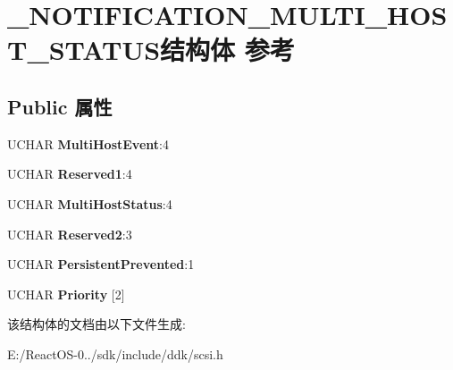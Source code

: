 \hypertarget{struct___n_o_t_i_f_i_c_a_t_i_o_n___m_u_l_t_i___h_o_s_t___s_t_a_t_u_s}{}\section{\+\_\+\+N\+O\+T\+I\+F\+I\+C\+A\+T\+I\+O\+N\+\_\+\+M\+U\+L\+T\+I\+\_\+\+H\+O\+S\+T\+\_\+\+S\+T\+A\+T\+U\+S结构体 参考}
\label{struct___n_o_t_i_f_i_c_a_t_i_o_n___m_u_l_t_i___h_o_s_t___s_t_a_t_u_s}
\subsection*{Public 属性}
\begin{DoxyCompactItemize}
\item 
\mbox{\label{struct___n_o_t_i_f_i_c_a_t_i_o_n___m_u_l_t_i___h_o_s_t___s_t_a_t_u_s_a2ab6e1273dca87231a5e6e82438574a3}} 
U\+C\+H\+AR {\bfseries Multi\+Host\+Event}\+:4
\item 
\mbox{\label{struct___n_o_t_i_f_i_c_a_t_i_o_n___m_u_l_t_i___h_o_s_t___s_t_a_t_u_s_a28c3740de6645ba499bded8568cf7526}} 
U\+C\+H\+AR {\bfseries Reserved1}\+:4
\item 
\mbox{\label{struct___n_o_t_i_f_i_c_a_t_i_o_n___m_u_l_t_i___h_o_s_t___s_t_a_t_u_s_a83ca88e2b365af63015f7e22d12b6eec}} 
U\+C\+H\+AR {\bfseries Multi\+Host\+Status}\+:4
\item 
\mbox{\label{struct___n_o_t_i_f_i_c_a_t_i_o_n___m_u_l_t_i___h_o_s_t___s_t_a_t_u_s_a4f3229c641f009014557c128196d10f2}} 
U\+C\+H\+AR {\bfseries Reserved2}\+:3
\item 
\mbox{\label{struct___n_o_t_i_f_i_c_a_t_i_o_n___m_u_l_t_i___h_o_s_t___s_t_a_t_u_s_a43bb29c4e3f4553335df92c5ac453bfc}} 
U\+C\+H\+AR {\bfseries Persistent\+Prevented}\+:1
\item 
\mbox{\label{struct___n_o_t_i_f_i_c_a_t_i_o_n___m_u_l_t_i___h_o_s_t___s_t_a_t_u_s_a4e4dd84d44985f4856409a47accbc123}} 
U\+C\+H\+AR {\bfseries Priority} \mbox{[}2\mbox{]}
\end{DoxyCompactItemize}


该结构体的文档由以下文件生成\+:\begin{DoxyCompactItemize}
\item 
E\+:/\+React\+O\+S-\/0../sdk/include/ddk/scsi.\+h\end{DoxyCompactItemize}
